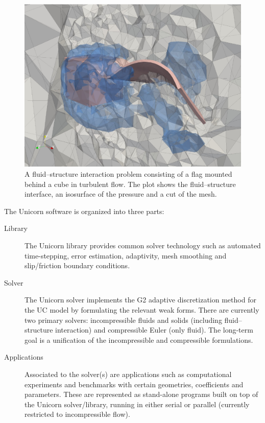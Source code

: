 
\begin{figure}
  \center
  \includegraphics[width=\largefig]{chapters/hoffman-2/pdf/cube556.pdf}
  \caption{A fluid--structure interaction problem consisting of a flag
    mounted behind a cube in turbulent flow. The plot shows the
    fluid--structure interface, an isosurface of the pressure and a
    cut of the mesh.}
  \label{fig:flag3D}
\end{figure}

The Unicorn software is organized into three parts:
\begin{description}
\item[Library] The Unicorn library provides common solver technology
  such as automated time-stepping, error estimation, adaptivity, mesh
  smoothing and slip/friction boundary conditions.

\item[Solver] The Unicorn solver implements the G2 adaptive
  discretization method for the UC model by formulating the relevant
  weak forms. There are currently two primary solvers: incompressible
  fluids and solids (including fluid--structure interaction) and
  compressible Euler (only fluid). The long-term goal is a
  unification of the incompressible and compressible formulations.

\item[Applications] Associated to the solver(s) are applications such
  as computational experiments and benchmarks with certain geometries,
  coefficients and parameters. These are represented as stand-alone
  programs built on top of the Unicorn solver/library, running in
  either serial or parallel (currently restricted to incompressible
  flow).
\end{description}

